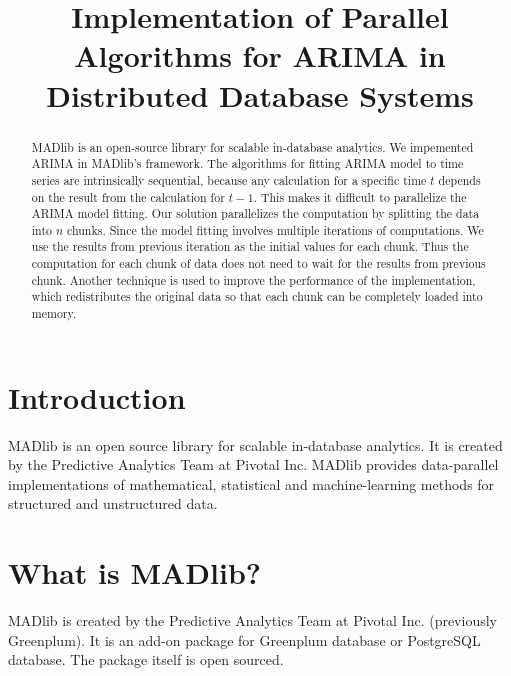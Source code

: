\documentclass[english,12pt]{article}
\begin{document}
\title{Implementation of Parallel Algorithms for ARIMA in Distributed
  Database Systems}


\maketitle

\begin{abstract}
    MADlib is an open-source library for scalable in-database analytics. We
    impemented ARIMA in MADlib's framework. The algorithms for fitting ARIMA
    model to time series are intrinsically sequential, because any calculation
    for a specific time $t$ depends on the result from the calculation for
    $t-1$.  This makes it difficult to parallelize the ARIMA model fitting. Our
    solution parallelizes the computation by splitting the data into $n$
    chunks. Since the model fitting involves multiple iterations of
    computations. We use the results from previous iteration as the initial
    values for each chunk. Thus the computation for each chunk of data does not
    need to wait for the results from previous chunk. Another technique is used
    to improve the performance of the implementation, which redistributes the
    original data so that each chunk can be completely loaded into memory.
\end{abstract}

\section{Introduction}

MADlib \cite{madlib} is an open source library for scalable in-database
analytics.  It is created by the Predictive Analytics Team at Pivotal Inc.
MADlib provides data-parallel implementations of mathematical, statistical and
machine-learning methods for structured and unstructured data.

\section{What is MADlib?}


MADlib is created by the Predictive Analytics Team at Pivotal Inc. (previously
Greenplum). It is an add-on package for Greenplum database or PostgreSQL
database. The package itself is open sourced.
\end{document}
